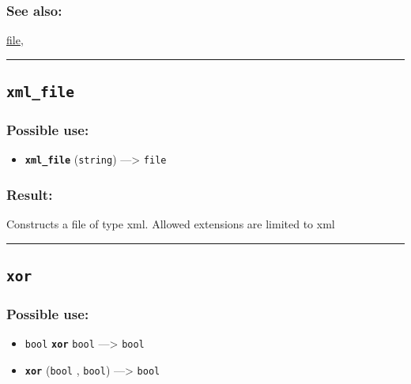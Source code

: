 \documentclass[]{book}
\providecommand{\tightlist}{%
  \setlength{\itemsep}{0pt}\setlength{\parskip}{0pt}}
\theoremstyle{definition}
\theoremstyle{definition}
\theoremstyle{definition}
\theoremstyle{remark}
\begin{document}
\subsubsection{See also:}\label{see-also-225}

\href{OperatorsDH\#file}{file},

\begin{center}\rule{0.5\linewidth}{\linethickness}\end{center}

\subsection{\texorpdfstring{\texttt{xml\_file}}{xml\_file}}\label{xml_file}

\subsubsection{Possible use:}\label{possible-use-565}

\begin{itemize}
\tightlist
\item
  \textbf{\texttt{xml\_file}} (\texttt{string}) ---\textgreater{}
  \texttt{file}
\end{itemize}

\subsubsection{Result:}\label{result-544}

Constructs a file of type xml. Allowed extensions are limited to xml

\begin{center}\rule{0.5\linewidth}{\linethickness}\end{center}

\subsection{\texorpdfstring{\texttt{xor}}{xor}}\label{xor}

\subsubsection{Possible use:}\label{possible-use-566}

\begin{itemize}
\tightlist
\item
  \texttt{bool} \textbf{\texttt{xor}} \texttt{bool} ---\textgreater{}
  \texttt{bool}
\item
  \textbf{\texttt{xor}} (\texttt{bool} , \texttt{bool})
  ---\textgreater{} \texttt{bool}
\end{itemize}
\end{document}
